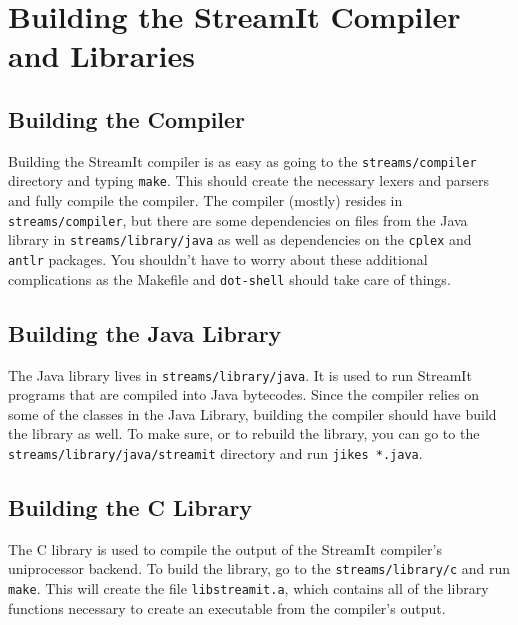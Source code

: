 \section{Building the StreamIt Compiler and Libraries}

\subsection{Building the Compiler}
Building the StreamIt compiler is as easy as
going to the {\tt streams/compiler} directory and typing
{\tt make}. This should create the necessary lexers and
parsers and fully compile the compiler.
The compiler (mostly) resides in {\tt streams/compiler},
but there are some dependencies on files from the Java 
library in {\tt streams/library\slash{}java} as well as 
dependencies on the {\tt cplex} and {\tt antlr} packages.
You shouldn't have to worry about these additional complications
as the Makefile and {\tt dot-shell} should take care of things.

\subsection{Building the Java Library}
The Java library lives in {\tt streams/library/java}. It is 
used to run StreamIt programs that are compiled into Java 
bytecodes. Since the compiler relies on some of the classes
in the Java Library, building the compiler should have build
the library as well. To make sure, or to rebuild the library,
you can go to the {\tt streams\slash{}library/java/streamit} 
directory and run {\tt jikes *.java}.

\subsection{Building the C Library}
The C library is used to compile the output of the StreamIt
compiler's uniprocessor backend. To build the library, 
go to the {\tt streams/library/c} and run {\tt make}. 
This will create the file {\tt libstreamit.a}, 
which contains all of the library functions necessary to create
an executable from the compiler's output.


